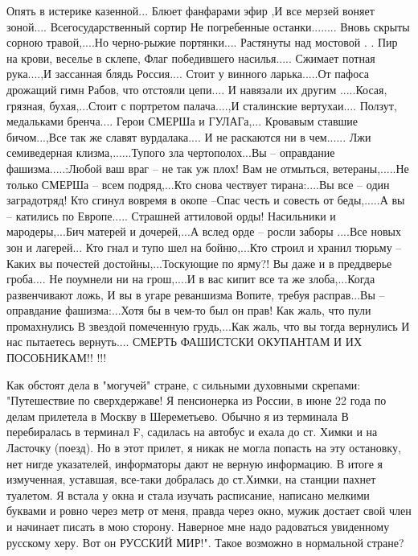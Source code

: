 Опять в истерике казенной... Блюет фанфарами эфир ,И все мерзей воняет
зоной.... Всегосударственный сортир Не погребенные останки........ Вновь скрыты
сорною травой,....Но черно-рыжие портянки.... Растянуты над мостовой . . Пир на
крови, веселье в склепе, Флаг победившего насилья..... Сжимает потная
рука....,И зассанная блядь Россия.... Стоит у винного ларька.....От пафоса
дрожащий гимн Рабов, что отстояли цепи.... И навязали их другим .....Косая,
грязная, бухая,...Стоит с портретом палача....,И сталинские вертухаи....
Ползут, медальками бренча.... Герои СМЕРШа и ГУЛАГа,... Кровавым ставшие
бичом...,Все так же славят вурдалака.... И не раскаются ни в чем...... Лжи
семиведерная клизма,......Тупого зла чертополох...Вы – оправдание
фашизма.....:Любой ваш враг – не так уж плох! Вам не отмыться, ветераны,.....Не
только СМЕРШа – всем подряд,...Кто снова чествует тирана:....Вы все – один
заградотряд! Кто сгинул вовремя в окопе –Спас честь и совесть от беды,.....А вы
– катились по Европе..... Страшней аттиловой орды! Насильники и мародеры,...Бич
матерей и дочерей,...А вслед орде – росли заборы ....Все новых зон и лагерей...
Кто гнал и тупо шел на бойню,...Кто строил и хранил тюрьму –Каких вы почестей
достойны,...Тоскующие по ярму?! Вы даже и в преддверье гроба.... Не поумнели ни
на грош,....И в вас кипит все та же злоба,...Когда развенчивают ложь, И вы в
угаре реваншизма Вопите, требуя расправ...Вы – оправдание фашизма:...Хотя бы в
чем-то был он прав! Как жаль, что пули промахнулись В звездой помеченную
грудь,...Как жаль, что вы тогда вернулись И нас пытаетесь вернуть.... СМЕРТЬ
ФАШИСТСКИ ОКУПАНТАМ И ИХ ПОСОБНИКАМ!! !!!

Как обстоят дела в "могучей" стране, с сильными духовными скрепами:
"Путешествие по сверхдержаве!  Я пенсионерка из России, в июне 22 года по делам
прилетела в Москву в Шереметьево. Обычно я из терминала В перебиралась в
терминал F, садилась на автобус и ехала до ст. Химки и на Ласточку (поезд). Но
в этот прилет, я никак не могла попасть на эту остановку, нет нигде указателей,
информаторы дают не верную информацию. В итоге я измученная, уставшая, все-таки
добралась до ст.Химки, на станции пахнет туалетом. Я встала у окна и стала
изучать расписание, написано мелкими буквами и ровно через метр от меня, правда
через окно, мужик достает свой член и начинает писать в мою сторону. Наверное
мне надо радоваться увиденному русскому херу. Вот он РУССКИЙ МИР!". Такое
возможно в нормальной стране?

